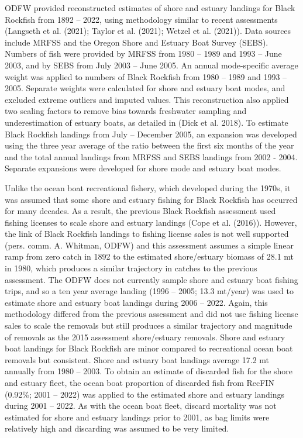 \documentclass[11pt,
  english,
  letterpaper,
]{article}
\begin{document}
ODFW provided reconstructed estimates of shore and estuary landings for Black Rockfish from 1892 -- 2022, using methodology similar to recent assessments (Langseth et al. (2021); Taylor et al. (2021); Wetzel et al. (2021)). Data sources include MRFSS and the Oregon Shore and Estuary Boat Survey (SEBS). Numbers of fish were provided by MRFSS from 1980 -- 1989 and 1993 -- June 2003, and by SEBS from July 2003 -- June 2005. An annual mode-specific average weight was applied to numbers of Black Rockfish from 1980 -- 1989 and 1993 -- 2005. Separate weights were calculated for shore and estuary boat modes, and excluded extreme outliers and imputed values. This reconstruction also applied two scaling factors to remove bias towards freshwater sampling and underestimation of estuary boats, as detailed in (Dick et al. 2018). To estimate Black Rockfish landings from July -- December 2005, an expansion was developed using the three year average of the ratio between the first six months of the year and the total annual landings from MRFSS and SEBS landings from 2002 - 2004. Separate expansions were developed for shore mode and estuary boat modes.

Unlike the ocean boat recreational fishery, which developed during the 1970s, it was assumed that some shore and estuary fishing for Black Rockfish has occurred for many decades. As a result, the previous Black Rockfish assessment used fishing licenses to scale shore and estuary landings (Cope et al. (2016)). However, the link of Black Rockfish landings to fishing license sales is not well supported (pers. comm. A. Whitman, ODFW) and this assessment assumes a simple linear ramp from zero catch in 1892 to the estimated shore/estuary biomass of 28.1 mt in 1980, which produces a similar trajectory in catches to the previous assessment. The ODFW does not currently sample shore and estuary boat fishing trips, and so a ten year average landing (1996 -- 2005; 13.3 mt/year) was used to estimate shore and estuary boat landings during 2006 -- 2022. Again, this methodology differed from the previous assessment and did not use fishing license sales to scale the removals but still produces a similar trajectory and magnitude of removals as the 2015 assessment shore/estuary removals. Shore and estuary boat landings for Black Rockfish are minor compared to recreational ocean boat removals but consistent. Shore and estuary boat landings average 17.2 mt annually from 1980 -- 2003. To obtain an estimate of discarded fish for the shore and estuary fleet, the ocean boat proportion of discarded fish from RecFIN (0.92\%; 2001 -- 2022) was applied to the estimated shore and estuary landings during 2001 -- 2022. As with the ocean boat fleet, discard mortality was not estimated for shore and estuary landings prior to 2001, as bag limits were relatively high and discarding was assumed to be very limited.
\end{document}
